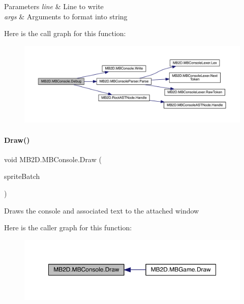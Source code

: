\begin{DoxyParams}{Parameters}
{\em line} & Line to write\\
\hline
{\em args} & Arguments to format into string\\
\hline
\end{DoxyParams}
Here is the call graph for this function\+:
\nopagebreak
\begin{figure}[H]
\begin{center}
\leavevmode
\includegraphics[width=350pt]{class_m_b2_d_1_1_m_b_console_a918307d1a003684b1fa3e0d11243b1f9_cgraph}
\end{center}
\end{figure}
\hypertarget{class_m_b2_d_1_1_m_b_console_ab737469f6fe24b287f7979f788adb8c9}{}\label{class_m_b2_d_1_1_m_b_console_ab737469f6fe24b287f7979f788adb8c9} 
\paragraph{\texorpdfstring{Draw()}{Draw()}}
{\footnotesize\ttfamily void M\+B2\+D.\+M\+B\+Console.\+Draw (\begin{DoxyParamCaption}\item[{Sprite\+Batch}]{sprite\+Batch }\end{DoxyParamCaption})\hspace{0.3cm}{\ttfamily [inline]}}



Draws the console and associated text to the attached window 

Here is the caller graph for this function\+:
\nopagebreak
\begin{figure}[H]
\begin{center}
\leavevmode
\includegraphics[width=350pt]{class_m_b2_d_1_1_m_b_console_ab737469f6fe24b287f7979f788adb8c9_icgraph}
\end{center}
\end{figure}
\hypertarget{class_m_b2_d_1_1_m_b_console_a745ef1f55523b29b83d4d94c1fe5400b}{}\label{class_m_b2_d_1_1_m_b_console_a745ef1f55523b29b83d4d94c1fe5400b} 
